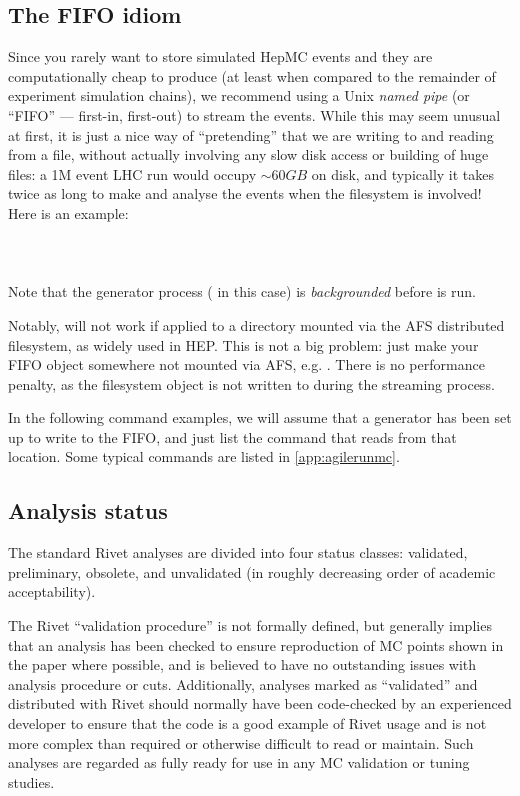 \subsection{The FIFO idiom}
\label{sec:fifo-idiom}

Since you rarely want to store simulated HepMC events and they are
computationally cheap to produce (at least when compared to the remainder of
experiment simulation chains), we recommend using a Unix \emph{named pipe} (or
``FIFO'' --- first-in, first-out) to stream the events. While this may seem
unusual at first, it is just a nice way of ``pretending'' that we are writing to
and reading from a file, without actually involving any slow disk access or
building of huge files: a 1M event LHC run would occupy $\sim 60 GB$ on disk,
and typically it takes twice as long to make and analyse the events when the
filesystem is involved! Here is an example:\\
\\
\\
\\
%
Note that the generator process ( in this case) is
\emph{backgrounded} before  is run.

Notably,  will not work if applied to a directory mounted via the
AFS distributed filesystem, as widely used in HEP. This is not a big problem:
just make your FIFO object somewhere not mounted via AFS, e.g. . There
is no performance penalty, as the filesystem object is not written to during the
streaming process.

In the following command examples, we will assume that a generator has been set
up to write to the  FIFO, and just list the  command
that reads from that location. Some typical  commands are
listed in \ref{app:agilerunmc}.


\subsection{Analysis status}

The standard Rivet analyses are divided into four status classes: validated,
preliminary, obsolete, and unvalidated (in roughly decreasing order of academic
acceptability).

The Rivet ``validation procedure'' is not formally
defined, but generally implies that an analysis has been checked to ensure
reproduction of MC points shown in the paper where possible, and is believed to
have no outstanding issues with analysis procedure or cuts.  Additionally,
analyses marked as ``validated'' and distributed with Rivet should normally have
been code-checked by an experienced developer to ensure that the code is a good
example of Rivet usage and is not more complex than required or otherwise
difficult to read or maintain. Such analyses are regarded as fully ready for use
in any MC validation or tuning studies.

